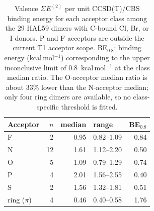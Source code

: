 \begin{table}[!htbp]\centering\small
\caption{Valence $\Sigma E^{(2)}$ per unit CCSD(T)/CBS binding energy for each acceptor class among the 29 HAL59 dimers with C-bound Cl, Br, or I donors. P and F acceptors are outside the current T1 acceptor scope. BE$_{0.8}$: binding energy (kcal\,mol$^{-1}$) corresponding to the upper inconclusive limit of 0.8~kcal\,mol$^{-1}$ at the class median ratio. The O-acceptor median ratio is about 33\% lower than the N-acceptor median; only four ring dimers are available, so no class-specific threshold is fitted.}\label{tab:classratio}
\begin{tabular}{lrrlr}\toprule Acceptor & $n$ & median & range & BE$_{0.8}$\\\midrule
F & 2 & 0.95 & 0.82--1.09 & 0.84\\
N & 12 & 1.61 & 1.12--2.20 & 0.50\\
O & 5 & 1.09 & 0.79--1.29 & 0.74\\
P & 4 & 2.01 & 1.56--2.55 & 0.40\\
S & 2 & 1.56 & 1.32--1.81 & 0.51\\
ring ($\pi$) & 4 & 0.46 & 0.40--0.58 & 1.76\\
\bottomrule\end{tabular}\end{table}
